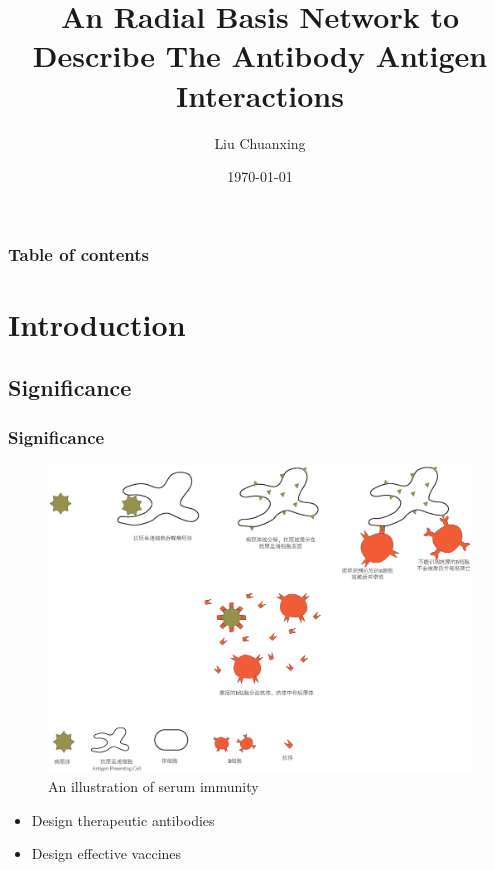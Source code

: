 \documentclass[hyperref={pdfpagelabels=false}]{beamer}
\title{An Radial Basis Network to Describe The Antibody Antigen Interactions}
\author{Liu Chuanxing}
\date{\today}
\begin{document}
\begin{frame}
\titlepage
\end{frame} 


\begin{frame}
\frametitle{Table of contents}
\tableofcontents
\end{frame} 


\section{Introduction} 
\subsection{Significance}
\begin{frame}
\frametitle{Significance} 
\begin{figure}
	\centering
	\includegraphics[scale=0.2]{SerumImmune}
	\caption{An illustration of serum immunity}
\end{figure}
\begin{itemize}
	\item Design therapeutic antibodies
	\item Design effective vaccines
\end{itemize}
\end{frame}
\end{document}
